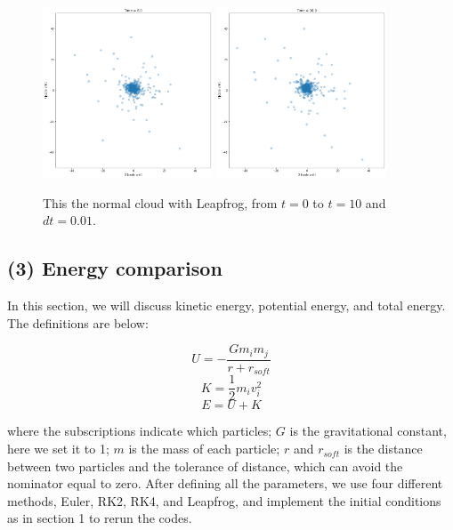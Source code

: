 \documentclass[12pt]{article}
\begin{document}
\begin{figure}[H]
        \includegraphics[width = 0.45\textwidth]{./LF/8.png} 
        \includegraphics[width = 0.45\textwidth]{./LF/10.png}  
        \caption{This the normal cloud with Leapfrog, from $t=0$ to $t=10$ and $dt=0.01$.}
        \label{LF}
    \end{figure}

    \subsection{(3) Energy comparison}
    In this section, we will discuss kinetic energy, potential energy, and total energy. The definitions are below:

    \[U = -\frac{Gm_{i}m_{j}}{r + r_{soft}}\]
    \[K = \frac{1}{2}m_{i}v_{i}^{2}\]
    \[E = U + K\]

    where the subscriptions indicate which particles; $G$ is the gravitational constant, here we set it to 1; $m$ is the mass of each particle; $r$ and $r_{soft}$ is the distance between two particles and the tolerance of distance, which can avoid the nominator equal to zero. After defining all the parameters, we use four different methods, Euler, RK2, RK4, and Leapfrog, and implement the initial conditions as in section 1 to rerun the codes.
\end{document}
